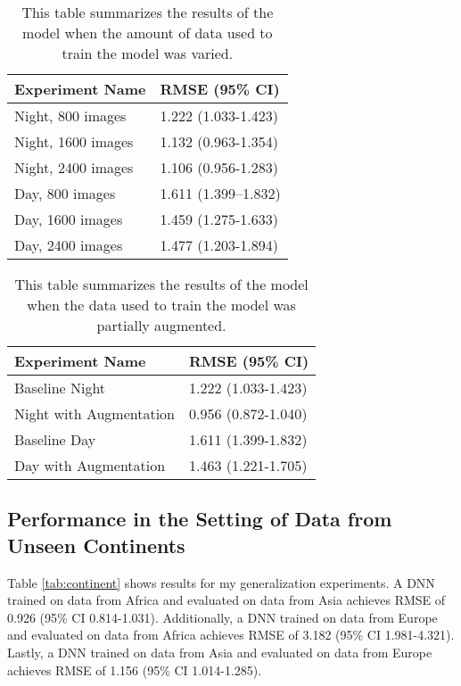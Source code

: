 \documentclass{article}
\begin{document}
\begin{table}[]
\centering
\begin{tabular}{@{}ll@{}}
\toprule
Experiment Name & RMSE (95\% CI)                 \\ \midrule
Night, 800 images  & 1.222 (1.033-1.423)         \\
Night, 1600 images  & 1.132 (0.963-1.354)        \\
Night, 2400 images  & 1.106 (0.956-1.283)        \\
Day, 800 images  & 1.611 (1.399–1.832)           \\
Day, 1600 images  & 1.459 (1.275-1.633)          \\
Day, 2400 images    & 1.477 (1.203-1.894)        \\ \bottomrule
\end{tabular}
\caption{This table summarizes the results of the model when the amount of data used to train the model was varied.}
\label{tab:quantity}
\end{table}

\begin{table}[]
\centering
\begin{tabular}{@{}ll@{}}
\toprule
Experiment Name & RMSE (95\% CI)                    \\ \midrule
Baseline Night  & 1.222 (1.033-1.423)               \\
Night with Augmentation  & 0.956 (0.872-1.040)      \\
Baseline Day  & 1.611 (1.399-1.832)                 \\
Day with Augmentation  & 1.463 (1.221-1.705)        \\ \bottomrule
\end{tabular}
\caption{This table summarizes the results of the model when the data used to train the model was partially augmented.}
\label{tab:augmentation}
\end{table}


\subsection{Performance in the Setting of Data from Unseen Continents}
Table \ref{tab:continent} shows results for my generalization experiments. A DNN trained on data from Africa and evaluated on data from Asia achieves RMSE of 0.926 (95\% CI 0.814-1.031). Additionally, a DNN trained on data from Europe and evaluated on data from Africa achieves RMSE of 3.182 (95\% CI 1.981-4.321). Lastly, a DNN trained on data from Asia and evaluated on data from Europe achieves RMSE of 1.156 (95\% CI 1.014-1.285).
\end{document}
